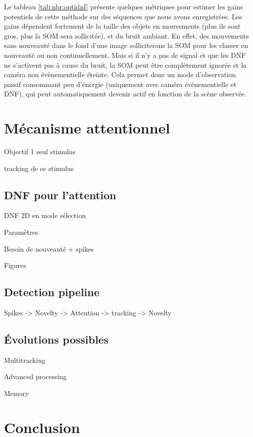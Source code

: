 	Le tableau \ref{tab:nbr:optidnf} présente quelques métriques pour estimer les gains potentiels de cette méthode sur des séquences que nous avons enregistrées. Les gains dépendent fortement de la taille des objets en mouvements (plus ils sont gros, plus la SOM sera sollicitée), et du bruit ambiant. En effet, des mouvements sans nouveauté dans le fond d'une image solliciterons la SOM pour les classer en nouveauté ou non continuellement. Mais si il n'y a pas de signal et que les DNF ne s'activent pas à cause du bruit, la SOM peut être complètement ignorée et la caméra non évènementielle éteinte. Cela permet donc un mode d'observation passif consommant peu d'énergie (uniquement avec caméra évènementielle et DNF), qui peut automatiquement devenir actif en fonction de la scène observée.

	\newpage

	\section{Mécanisme attentionnel}

	Objectif 1 seul stimulus

	tracking de ce stimulus

	\subsection{DNF pour l'attention}

	DNF 2D en mode sélection

	Paramètres

	Besoin de nouveauté + spikes

	Figures 

	\subsection{Detection pipeline}

	Spikes -> Novelty -> Attention -> tracking -> Novelty

	\subsection{Évolutions possibles}

	Multitracking

	Advanced processing

	Memory

	\section{Conclusion}
		

